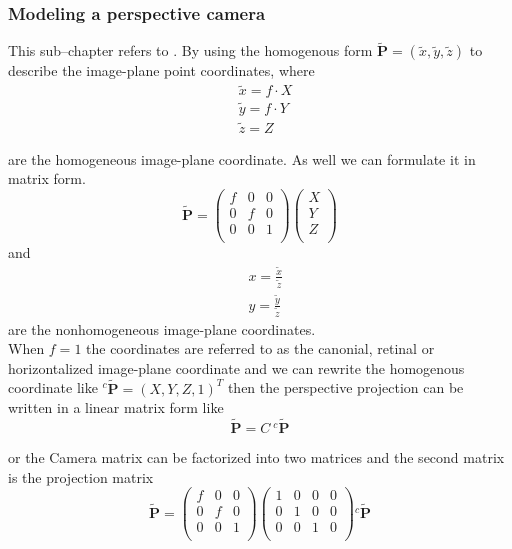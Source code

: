 \documentclass[journal,final,a4paper,twoside]{PS}
\begin{document}
\subsubsection{Modeling a perspective camera}
This sub--chapter refers to \cite{Corke}. By using the homogenous form $\tilde{\textbf{P}}=(\tilde{x} ,\tilde{y} ,\tilde{z} )$ to describe the image-plane point coordinates, where \begin{subequations}\begin{align}
&\tilde{x}=f\cdot X\label{eq:homo_x}\\
&\tilde{y}=f\cdot Y\label{eq:homo_y}\\
&\tilde{z}=Z\label{eq:homo_z}
\end{align}
\end{subequations}


are the homogeneous image-plane coordinate. As well we can formulate it in matrix form\cite{Corke}.
\begin{equation}
\tilde{\textbf{P}} = \begin{pmatrix}
f&0&0\\
0&f&0\\
0&0&1\\
\end{pmatrix}
\begin{pmatrix}
X\\
Y\\
Z\\
\end{pmatrix}
\end{equation}
and
\begin{align}
&x=\frac{\tilde{x}}{\tilde{z}}\\& y= \frac{\tilde{y}}{\tilde{z}}
\end{align}
are the nonhomogeneous image-plane coordinates.
\\
When $f=1$ the coordinates are referred to as the canonial, retinal or horizontalized image-plane coordinate and we can rewrite the homogenous coordinate like $ {}^{c}\tilde{\textbf{P}} = (X,Y,Z,1)^T $
then the perspective projection can be written in a linear matrix form like
\begin{equation}
\tilde{\textbf{P}} = C{}~^{c}\tilde{\textbf{P}}
\end{equation}

or the Camera matrix can be factorized into two matrices and the second matrix is the projection matrix 
\begin{equation}
\tilde{\textbf{P}} = \begin{pmatrix}
f&0&0\\
0&f&0\\
0&0&1\\
\end{pmatrix}\begin{pmatrix}
1&0&0&0\\
0&1&0&0\\
0&0&1&0\\
\end{pmatrix}{}^{c}\tilde{\textbf{P}}
\end{equation}
\end{document}
